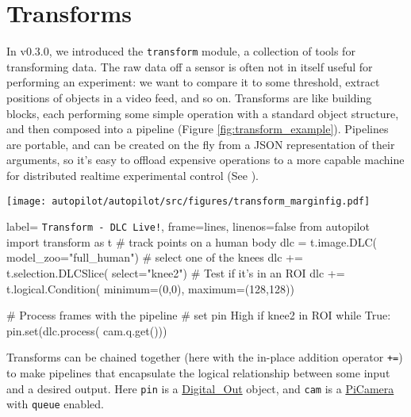 \section{Transforms}
\label{sec:transforms}

In v0.3.0, we introduced the \texttt{transform} module, a collection of tools for transforming data. The raw data off a sensor is often not in itself useful for performing an experiment: we want to compare it to some threshold, extract positions of objects in a video feed, and so on. Transforms are like building blocks, each performing some simple operation with a standard object structure, and then composed into a pipeline (Figure \ref{fig:transform_example}). Pipelines are portable, and can be created on the fly from a JSON representation of their arguments, so it's easy to offload expensive operations to a more capable machine for distributed realtime experimental control (See \citep{kaneRealtimeLowlatencyClosedloop2020a}). 

\begin{marginfigure}[-8cm]
\texttt{[image: autopilot/autopilot/src/figures/transform\_marginfig.pdf]}
\end{marginfigure}

\begin{marginfigure}[-3.5cm]
\begin{pythoncode*}{
label= \texttt{Transform - DLC Live!},
frame=lines,
linenos=false}
from autopilot import transform as t
# track points on a human body
dlc = t.image.DLC(
    model_zoo="full_human")
# select one of the knees
dlc += t.selection.DLCSlice(
    select="knee2")
# Test if it's in an ROI
dlc += t.logical.Condition(
    minimum=(0,0),
    maximum=(128,128))

# Process frames with the pipeline
# set pin High if knee2 in ROI
while True:
    pin.set(dlc.process(
        cam.q.get()))
\end{pythoncode*}
\caption{Transforms can be chained together (here with the in-place addition operator \texttt{+=}) to make pipelines that encapsulate the logical relationship between some input and a desired output. Here \texttt{pin} is a \href{https://docs.auto-pi-lot.com/en/latest/hardware/gpio.html\#autopilot.hardware.gpio.Digital_Out}{Digital\_Out} object, and \texttt{cam} is a \href{https://docs.auto-pi-lot.com/en/latest/hardware/cameras.html\#autopilot.hardware.cameras.PiCamera}{PiCamera} with \texttt{queue} enabled.}
\label{fig:transform_example}

\end{marginfigure}

